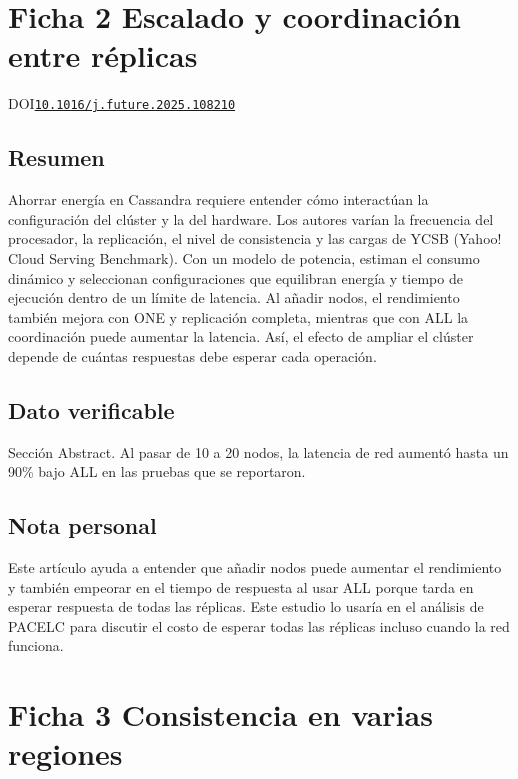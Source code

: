 \documentclass[11pt,a4paper,onecolumn]{article}
\begin{document}
\clearpage

\section*{Ficha 2 Escalado y coordinación entre réplicas}

\noindent\cite{nejati_sharif_aldin_watts_2026}\enspace{}

\noindent DOI\enspace\href{https://doi.org/10.1016/j.future.2025.108210}{\nolinkurl{10.1016/j.future.2025.108210}}

\subsection*{Resumen}

Ahorrar energía en Cassandra requiere entender cómo interactúan la configuración del clúster y la del hardware. Los autores varían la frecuencia del procesador, la replicación, el nivel de consistencia y las cargas de YCSB (Yahoo! Cloud Serving Benchmark). Con un modelo de potencia, estiman el consumo dinámico y seleccionan configuraciones que equilibran energía y tiempo de ejecución dentro de un límite de latencia. Al añadir nodos, el rendimiento también mejora con ONE y replicación completa, mientras que con ALL la coordinación puede aumentar la latencia. Así, el efecto de ampliar el clúster depende de cuántas respuestas debe esperar cada operación.

\subsection*{Dato verificable}

Sección Abstract. Al pasar de 10 a 20 nodos, la latencia de red aumentó hasta un 90\% bajo ALL en las pruebas que se reportaron.

\subsection*{Nota personal}

Este artículo ayuda a entender que añadir nodos puede aumentar el rendimiento y también empeorar en el tiempo de respuesta al usar ALL porque tarda en esperar respuesta de todas las réplicas. Este estudio lo usaría en el análisis de PACELC para discutir el costo de esperar todas las réplicas incluso cuando la red funciona.

\clearpage

\section*{Ficha 3 Consistencia en varias regiones}
\end{document}
